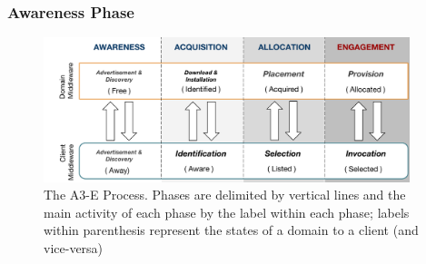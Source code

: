 


\subsubsection*{Awareness Phase}\label{sec:A3-E-awareness}

\begin{figure}[tbp]
	\includegraphics[width=0.95\textwidth]{figs/A3-E-process}
	\caption{The A3-E Process. Phases are delimited by vertical lines and the main activity of each phase by the label within each phase; labels within parenthesis represent the states of a domain to a client (and vice-versa)}
	\label{fig:A3-E-process}
\end{figure}


